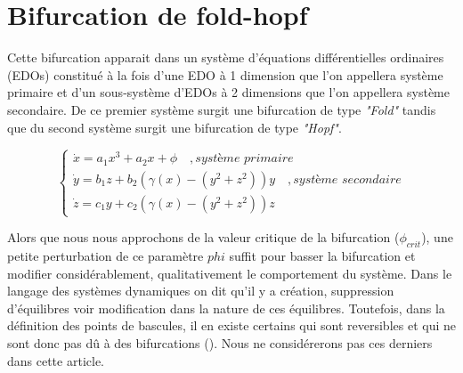 \section{Bifurcation de fold-hopf}

Cette bifurcation apparait dans un système d'équations différentielles ordinaires (EDOs) constitué à la fois d'une EDO à 1 dimension que l'on appellera système primaire et d'un sous-système d'EDOs à 2 dimensions que l'on appellera système secondaire. De ce premier système surgit une bifurcation de type \emph{"Fold"} tandis que du second système surgit une bifurcation de type \emph{"Hopf"}.

\begin{equation}
  \begin{cases}
    \dot{x} = a_1x^3 + a_2x + \phi \quad, \textit{système primaire} \\
    \dot{y} = b_1z + b_2(\gamma(x) - (y^2 + z^2))y \quad, \textit{système secondaire} \\
    \dot{z} = c_1y + c_2(\gamma(x) - (y^2 + z^2))z
  \end{cases}
\end{equation}

Alors que nous nous approchons de la valeur critique de la bifurcation ($\phi_{crit}$), une petite perturbation de ce paramètre $phi$ suffit pour basser la bifurcation et modifier considérablement, qualitativement le comportement du système. Dans le langage des systèmes dynamiques on dit qu'il y a création, suppression d'équilibres voir modification dans la nature de ces équilibres. Toutefois, dans la définition des points de bascules, il en existe certains qui sont reversibles et qui ne sont donc pas dû à des bifurcations (\cite{lenton_tipping_2008}). Nous ne considérerons pas ces derniers dans cette article.
